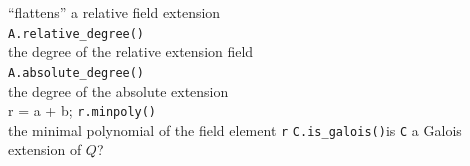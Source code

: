 \documentclass{article}
\newcommand{\ex}{\color{blue}}
\newcommand{\skipin}{\hspace*{12pt}}
\begin{document}
\begin{multicols*}{3}
\skipin ``flattens'' a relative field extension\\
{\ex\verb!A.relative_degree()!}\\
\skipin the degree of the relative extension field\\
{\ex\verb!A.absolute_degree()!}\\
\skipin the degree of the absolute extension\\
{\ex r = a + b; \verb!r.minpoly()!}\\
\skipin the minimal polynomial of the field element \verb!r!
{\ex\verb!C.is_galois()!}\quad is \verb!C! a Galois extension of $Q$?\\
\par
\end{multicols*}
\end{document}
